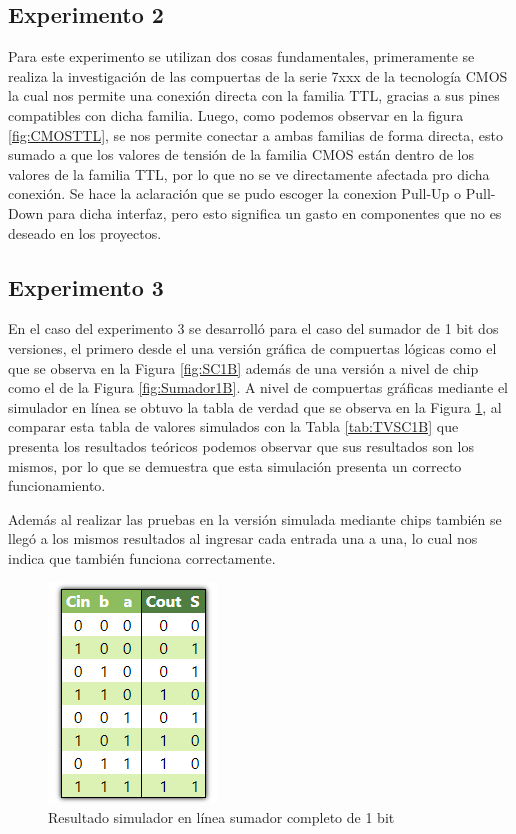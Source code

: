 \documentclass[journal]{IEEEtran}
\begin{document}
	\subsection{Experimento 2}
	Para este experimento se utilizan dos cosas fundamentales, primeramente se realiza la investigación de las compuertas de la serie 7xxx de la tecnología CMOS la cual nos permite una conexión directa con la familia TTL, gracias a sus pines compatibles con dicha familia. Luego, como podemos observar en la figura \ref{fig:CMOSTTL}, se nos permite conectar a ambas familias de forma directa, esto sumado a que los valores de tensión de la familia CMOS están dentro de los valores de la familia TTL, por lo que no se ve directamente afectada pro dicha conexión. Se hace la aclaración que se pudo escoger la conexion Pull-Up o Pull-Down para dicha interfaz, pero esto significa un gasto en componentes que no es deseado en los proyectos. 
	
	\subsection{Experimento 3}
	
	En el caso del experimento 3 se desarrolló para el caso del sumador de 1 bit dos versiones, el primero desde el una versión gráfica de compuertas lógicas como el que se observa en la Figura \ref{fig:SC1B} además de una versión a nivel de chip como el de la Figura \ref{fig:Sumador1B}. A nivel de compuertas gráficas mediante el simulador en línea se obtuvo la tabla de verdad que se observa en la Figura \ref{fig:TSC1B}, al comparar esta tabla de valores simulados con la Tabla \ref{tab:TVSC1B} que presenta los resultados teóricos podemos observar que sus resultados son los mismos, por lo que se demuestra que esta simulación presenta un correcto funcionamiento.
	
	Además al realizar las pruebas en la versión simulada mediante chips también se llegó a los mismos resultados al ingresar cada entrada una a una, lo cual nos indica que también funciona correctamente.
	
	\begin{figure}[htb]
		\centering
		\includegraphics[scale = 0.7]{img/TSC1B.png}
		\caption{Resultado simulador en línea sumador completo de 1 bit}
		\label{fig:TSC1B}
	\end{figure}
	
\end{document}
